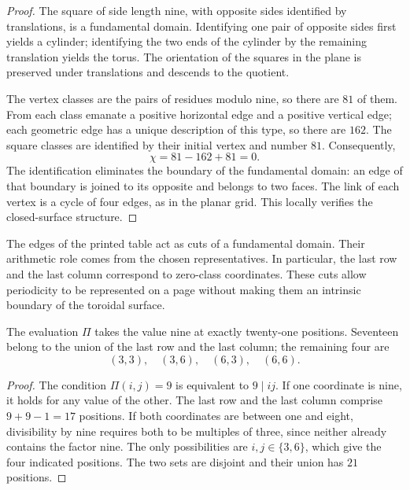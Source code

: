 \begin{proof}
The square of side length nine, with opposite sides identified by translations, is a fundamental domain. Identifying one pair of opposite sides first yields a cylinder; identifying the two ends of the cylinder by the remaining translation yields the torus. The orientation of the squares in the plane is preserved under translations and descends to the quotient.

The vertex classes are the pairs of residues modulo nine, so there are $81$ of them. From each class emanate a positive horizontal edge and a positive vertical edge; each geometric edge has a unique description of this type, so there are $162$. The square classes are identified by their initial vertex and number $81$. Consequently,
\[
 \chi=81-162+81=0.
\]
The identification eliminates the boundary of the fundamental domain: an edge of that boundary is joined to its opposite and belongs to two faces. The link of each vertex is a cycle of four edges, as in the planar grid. This locally verifies the closed-surface structure.
\end{proof}

The edges of the printed table act as cuts of a fundamental domain. Their arithmetic role comes from the chosen representatives. In particular, the last row and the last column correspond to zero-class coordinates. These cuts allow periodicity to be represented on a page without making them an intrinsic boundary of the toroidal surface.

\begin{proposicion}
\label{geo:prop-ceros}
The evaluation $\Pi$ takes the value nine at exactly twenty-one positions. Seventeen belong to the union of the last row and the last column; the remaining four are
\[
 (3,3),\quad(3,6),\quad(6,3),\quad(6,6).
\]
\end{proposicion}

\begin{proof}
The condition $\Pi(i,j)=9$ is equivalent to $9\mid ij$. If one coordinate is nine, it holds for any value of the other. The last row and the last column comprise $9+9-1=17$ positions. If both coordinates are between one and eight, divisibility by nine requires both to be multiples of three, since neither already contains the factor nine. The only possibilities are $i,j\in\{3,6\}$, which give the four indicated positions. The two sets are disjoint and their union has $21$ positions.
\end{proof}


